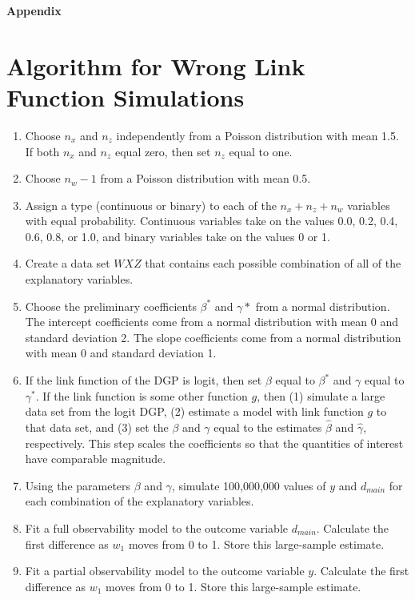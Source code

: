 \documentclass[10pt]{article}
\begin{document}
\newpage
\begin{appendix}
\begin{center}
{\LARGE \textbf{Appendix}}
\end{center}
\section{Algorithm for Wrong Link Function Simulations}\label{app:link}

\begin{enumerate}
\item Choose $n_x$ and $n_z$ independently from a Poisson distribution with mean 1.5. If both $n_x$ and $n_z$ equal zero, then set $n_z$ equal to one.
\item Choose $n_w - 1$ from a Poisson distribution with mean 0.5.
\item Assign a type (continuous or binary) to each of the $n_x + n_z + n_w$ variables with equal probability. Continuous variables take on the values 0.0, 0.2, 0.4, 0.6, 0.8, or 1.0, and binary variables take on the values 0 or 1.
\item Create a data set $WXZ$ that contains each possible combination of all of the explanatory variables.
\item Choose the preliminary coefficients $\beta^*$ and $\gamma*$ from a normal distribution. The intercept coefficients come from a normal distribution with mean 0 and standard deviation 2. The slope coefficients come from a normal distribution with mean 0 and standard deviation 1.
\item If the link function of the DGP is logit, then set $\beta$ equal to $\beta^*$ and $\gamma$ equal to $\gamma^*$. If the link function is some other function $g$, then (1) simulate a large data set from the logit DGP, (2) estimate a model with link function $g$ to that data set, and (3) set the $\beta$ and $\gamma$ equal to the estimates $\hat{\beta}$ and $\hat{\gamma}$, respectively. This step scales the coefficients so that the quantities of interest have comparable magnitude.
\item Using the parameters $\beta$ and $\gamma$, simulate 100,000,000 values of $y$ and $d_{main}$ for each combination of the explanatory variables.
\item Fit a full observability model to the outcome variable $d_{main}$. Calculate the first difference as $w_1$ moves from 0 to 1. Store this large-sample estimate.
\item Fit a partial observability model to the outcome variable $y$. Calculate the first difference as $w_1$ moves from 0 to 1. Store this large-sample estimate.
\end{enumerate}


\end{appendix}
\end{document}
